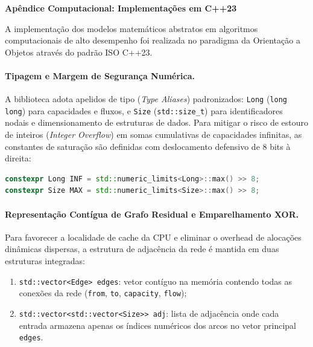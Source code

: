 \documentclass[12pt,a4paper]{article}
\begin{document}
\newpage

\begin{center}{\Large\textbf{Apêndice Computacional: Implementações em C++23}}\end{center}

\label{ap:arquitetura}

A implementação dos modelos matemáticos abstratos em algoritmos computacionais de alto desempenho foi realizada no paradigma da Orientação a Objetos através do padrão ISO C++23.

\paragraph{Tipagem e Margem de Segurança Numérica.}
A biblioteca adota apelidos de tipo (\textit{Type Aliases}) padronizados: \lstinline{Long} (\lstinline{long long}) para capacidades e fluxos, e \lstinline{Size} (\lstinline{std::size_t}) para identificadores nodais e dimensionamento de estruturas de dados. Para mitigar o risco de estouro de inteiros (\textit{Integer Overflow}) em somas cumulativas de capacidades infinitas, as constantes de saturação são definidas com deslocamento defensivo de 8 bits à direita:
\begin{lstlisting}[language=C++, numbers=none, basicstyle=\ttfamily\footnotesize, frame=none, backgroundcolor=\color{white}]
constexpr Long INF = std::numeric_limits<Long>::max() >> 8;
constexpr Size MAX = std::numeric_limits<Size>::max() >> 8;
\end{lstlisting}

\paragraph{Representação Contígua de Grafo Residual e Emparelhamento XOR.}
Para favorecer a localidade de cache da CPU e eliminar o overhead de alocações dinâmicas dispersas, a estrutura de adjacência da rede é mantida em duas estruturas integradas:
\begin{enumerate}
    \item \lstinline{std::vector<Edge> edges}: vetor contíguo na memória contendo todas as conexões da rede (\lstinline{from}, \lstinline{to}, \lstinline{capacity}, \lstinline{flow});
    \item \lstinline{std::vector<std::vector<Size>> adj}: lista de adjacência onde cada entrada armazena apenas os índices numéricos dos arcos no vetor principal \lstinline{edges}.
\end{enumerate}
\end{document}
